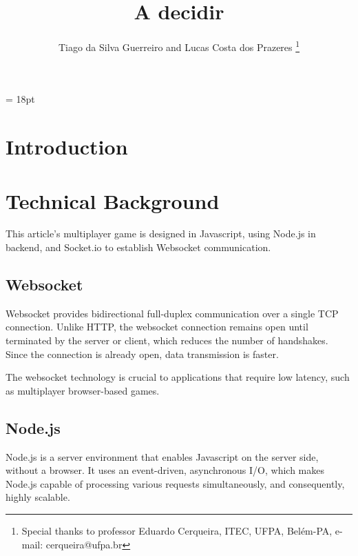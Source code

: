 \documentclass[english]{sbrt}
\begin{document}

\title{A decidir}

\author{Tiago da Silva Guerreiro and Lucas Costa dos Prazeres
  \thanks{Special thanks to professor Eduardo Cerqueira, ITEC, UFPA, Belém-PA, e-mail: cerqueira@ufpa.br}
}

\maketitle

\baselineskip = 18pt


\begin{abstract}

\end{abstract}

\begin{keywords}

\end{keywords}

\section{\textbf{Introduction}}

\section{\textbf{Technical Background}}

This article's multiplayer game is designed in Javascript, using Node.js in backend, and Socket.io to establish Websocket communication.

\subsection{\textbf{Websocket}}
Websocket provides bidirectional full-duplex communication over a single TCP connection. Unlike HTTP, the websocket connection remains open until terminated by the server or client, which reduces the number of handshakes. Since the connection is already open, data transmission is faster.

The websocket technology is crucial to applications that require low latency, such as multiplayer browser-based games.

\subsection{\textbf{Node.js}}
Node.js is a server environment that enables Javascript on the server side, without a browser. It uses an event-driven, asynchronous I/O, which makes Node.js capable of processing various requests simultaneously, and consequently, highly scalable.
\end{document}
